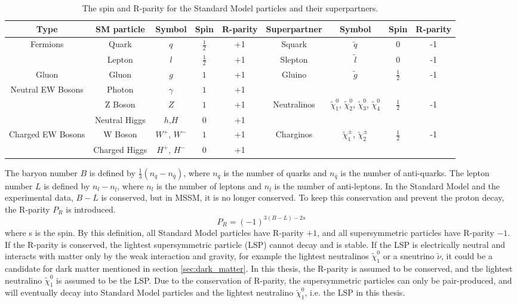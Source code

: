 \begin{table}[htbp]
\tiny
\centering
\begin{tabular}{|c|cccc|cccc|}
\hline
\hline
Type & SM particle & Symbol & Spin & R-parity & Superpartner & Symbol & Spin & R-parity \\
\hline
\hline
Fermions & Quark  & $q$ & $\frac{1}{2}$ & +1 & Squark  & $\tilde{q}$ & 0 & -1 \\
         & Lepton & $l$ & $\frac{1}{2}$ & +1 & Slepton & $\tilde{l}$ & 0 & -1 \\
\hline
Gluon & Gluon  & $g$ & $1$ & +1 & Gluino & $\tilde{g}$ & $\frac{1}{2}$ & -1  \\
\hline
Neutral EW Bosons & Photon         & $\gamma$ & $1$ & +1
                  &  &  &  &  \\
                  & Z Boson        & $Z$      & $1$ & +1
                  & Neutralinos & $\tilde{\chi}_1^0$, $\tilde{\chi}_2^0$, $\tilde{\chi}_3^0$, $\tilde{\chi}_4^0$ & $\frac{1}{2}$ & -1 \\
                  & Neutral Higgs  & $h$,$H$  & $0$ & +1
                  &  &  &  &  \\
\hline
Charged EW Bosons & W Boson        & $W^+$, $W^-$  & $1$ & +1
                  & Charginos & $\tilde{\chi}_1^\pm$, $\tilde{\chi}_2^\pm$ & $\frac{1}{2}$ & -1 \\
                  & Charged Higgs  & $H^+$, $H^-$  & $0$ & +1
                  &  &  &  &  \\
\hline
\hline
\end{tabular}
\caption{The spin and R-parity for the Standard Model particles and their superpartners.}
\label{tab:SUSY_particle}
\end{table}

The baryon number $B$ is defined by $\frac{1}{3} (n_q - n_{\bar{q}})$, where $n_q$ is the number of quarks and $n_{\bar{q}}$ is the number of anti-quarks.
The lepton number $L$ is defined by $n_l - n_{\bar{l}}$, where $n_l$ is the number of leptons and $n_{\bar{l}}$ is the number of anti-leptons.
In the Standard Model and the experimental data, $B-L$ is conserved, but in MSSM, it is no longer conserved.
To keep this conservation and prevent the proton decay, the R-parity $P_R$ is introduced.
\begin{equation}
P_R = (-1)^{3(B-L)-2s}
\end{equation}
where s is the spin.
By this definition, all Standard Model particles have R-parity $+1$, and all supersymmetric particles have R-parity $-1$.
If the R-parity is conserved, the lightest supersymmetric particle (LSP) cannot decay and is stable.
If the LSP is electrically neutral and interacts with matter only by the weak interaction and gravity, for example the lightest neutralinos $\tilde{\chi}_1^0$ or a sneutrino $\tilde{\nu}$, it could be a candidate for dark matter mentioned in section \ref{sec:dark_matter}.
In this thesis, the R-parity is assumed to be conserved, and the lightest neutralino $\tilde{\chi}_1^0$ is assumed to be the LSP.
Due to the conservation of R-parity, the supersymmetric particles can only be pair-produced, and will eventually decay into Standard Model particles and the lightest neutralino $\tilde{\chi}_1^0$, i.e. the LSP in this thesis.

